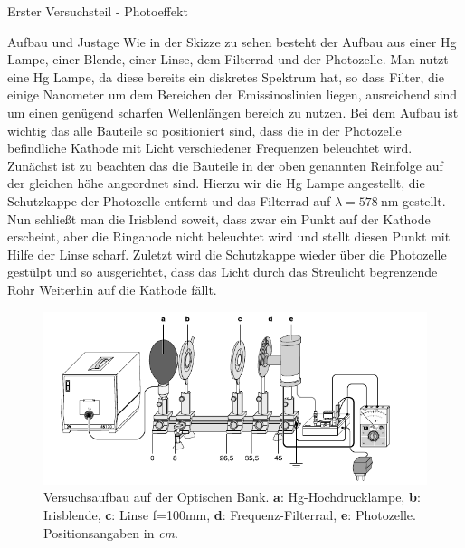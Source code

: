 \documentclass[pdftex, a4paper,11pt, twoside, ngerman]{report}
\begin{document}
  \begin{chapter}{Erster Versuchsteil - Photoeffekt}
    \label{chp:Photoeffekt}
    
    
    
    \begin{section}{Aufbau und Justage}
      \label{chp:photoeffekt:sec:AufbauJustage}
      Wie in der Skizze zu sehen besteht der Aufbau aus einer Hg Lampe, einer Blende, einer Linse, dem Filterrad und der Photozelle. 
      Man nutzt eine Hg Lampe, da diese bereits ein diskretes Spektrum hat, so dass Filter, die einige Nanometer um dem Bereichen der Emissinoslinien liegen, ausreichend sind um einen genügend scharfen Wellenlängen bereich zu nutzen. 
        Bei dem Aufbau ist wichtig das alle Bauteile so positioniert sind, dass die in der Photozelle befindliche Kathode mit Licht verschiedener Frequenzen beleuchtet wird.
      Zunächst ist zu beachten das die Bauteile in der oben genannten Reinfolge auf der gleichen höhe angeordnet sind.
      Hierzu wir die Hg Lampe angestellt, die Schutzkappe der Photozelle entfernt und das Filterrad auf $\lambda = \SI{578}{\nano\meter}$ gestellt.
      Nun schließt man die Irisblend soweit, dass zwar ein Punkt auf der Kathode erscheint, aber die Ringanode nicht beleuchtet wird und stellt diesen Punkt mit Hilfe der Linse scharf.
      Zuletzt wird die Schutzkappe wieder über die Photozelle gestülpt und so ausgerichtet, dass das Licht durch das Streulicht begrenzende Rohr Weiterhin auf die Kathode fällt.
      \begin{figure}[htbp]
        \begin{center}
          \includegraphics[width=.9\textwidth]{Figures/Planckaufbau.png}
          \caption{Versuchsaufbau auf der Optischen Bank. \textbf{a}: Hg-Hochdrucklampe, \textbf{b}: Irisblende,  \textbf{c}: Linse f=100mm, \textbf{d}: Frequenz-Filterrad, \textbf{e}: Photozelle. Positionsangaben in \textit{cm}. \cite{bib:LDDidactic}}\label{fig:Planckaufbau}

\end{center}
\end{figure}
\end{section}
\end{chapter}
\end{document}
